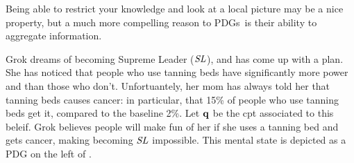\documentclass{article}
\newcommand{\MN}{PDG}
\newcommand{\MNs}{\MN s}
\numberwithin{equation}{section}
\begin{document}
	Being able to restrict your knowledge and look at a local picture may be a nice property, but a much more compelling reason to \MNs\ is their ability to aggregate information.
	
	\begin{example}\label{ex:grok-union}
		Grok dreams of becoming Supreme Leader ($\it SL$), and has come up with a plan. She has noticed that people who use tanning beds have significantly more power and than those who don't. Unfortuantely, her mom has always told her that tanning beds causes cancer: in particular, that 15\% of people who use tanning beds get it, compared to the baseline 2\%. Let $\mathbf q$ be the cpt associated to this beleif. 
		Grok believes people will make fun of her if she uses a tanning bed and gets cancer, making becoming $\it SL$ impossible. This mental state is depicted as a PDG on the left of .
		
		\begin{figure}
			\centering
\end{figure}
\end{example}
\end{document}
